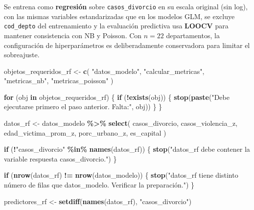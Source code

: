 \documentclass[
]{article}
\newenvironment{Shaded}{\begin{snugshade}}{\end{snugshade}}
\newcommand{\ControlFlowTok}[1]{\textcolor[rgb]{0.13,0.29,0.53}{\textbf{#1}}}
\newcommand{\FunctionTok}[1]{\textcolor[rgb]{0.13,0.29,0.53}{\textbf{#1}}}
\newcommand{\NormalTok}[1]{#1}
\newcommand{\OtherTok}[1]{\textcolor[rgb]{0.56,0.35,0.01}{#1}}
\newcommand{\SpecialCharTok}[1]{\textcolor[rgb]{0.81,0.36,0.00}{\textbf{#1}}}
\newcommand{\StringTok}[1]{\textcolor[rgb]{0.31,0.60,0.02}{#1}}
\begin{document}
Se entrena como \textbf{regresión} sobre \texttt{casos\_divorcio} en su
escala original (sin log), con las mismas variables estandarizadas que
en los modelos GLM, se excluye \texttt{cod\_depto} del entrenamiento y
la evaluación predictiva usa \textbf{LOOCV} para mantener consistencia
con NB y Poisson. Con \(n = 22\) departamentos, la configuración de
hiperparámetros es deliberadamente conservadora para limitar el
sobreajuste.

\begin{Shaded}
\begin{Highlighting}[]
\NormalTok{objetos\_requeridos\_rf }\OtherTok{\textless{}{-}} \FunctionTok{c}\NormalTok{(}
  \StringTok{"datos\_modelo"}\NormalTok{, }\StringTok{"calcular\_metricas"}\NormalTok{, }\StringTok{"metricas\_nb"}\NormalTok{, }\StringTok{"metricas\_poisson"}
\NormalTok{)}

\ControlFlowTok{for}\NormalTok{ (obj }\ControlFlowTok{in}\NormalTok{ objetos\_requeridos\_rf) \{}
  \ControlFlowTok{if}\NormalTok{ (}\SpecialCharTok{!}\FunctionTok{exists}\NormalTok{(obj)) \{}
    \FunctionTok{stop}\NormalTok{(}\FunctionTok{paste}\NormalTok{(}\StringTok{"Debe ejecutarse primero el paso anterior. Falta:"}\NormalTok{, obj))}
\NormalTok{  \}}
\NormalTok{\}}
\end{Highlighting}
\end{Shaded}

\begin{Shaded}
\begin{Highlighting}[]
\NormalTok{datos\_rf }\OtherTok{\textless{}{-}}\NormalTok{ datos\_modelo }\SpecialCharTok{\%\textgreater{}\%}
  \FunctionTok{select}\NormalTok{(}
\NormalTok{    casos\_divorcio,}
\NormalTok{    casos\_violencia\_z,}
\NormalTok{    edad\_victima\_prom\_z,}
\NormalTok{    porc\_urbano\_z,}
\NormalTok{    es\_capital}
\NormalTok{  )}

\ControlFlowTok{if}\NormalTok{ (}\SpecialCharTok{!}\StringTok{"casos\_divorcio"} \SpecialCharTok{\%in\%} \FunctionTok{names}\NormalTok{(datos\_rf)) \{}
  \FunctionTok{stop}\NormalTok{(}\StringTok{"datos\_rf debe contener la variable respuesta casos\_divorcio."}\NormalTok{)}
\NormalTok{\}}

\ControlFlowTok{if}\NormalTok{ (}\FunctionTok{nrow}\NormalTok{(datos\_rf) }\SpecialCharTok{!=} \FunctionTok{nrow}\NormalTok{(datos\_modelo)) \{}
  \FunctionTok{stop}\NormalTok{(}\StringTok{"datos\_rf tiene distinto número de filas que datos\_modelo. Verificar la preparación."}\NormalTok{)}
\NormalTok{\}}

\NormalTok{predictores\_rf }\OtherTok{\textless{}{-}} \FunctionTok{setdiff}\NormalTok{(}\FunctionTok{names}\NormalTok{(datos\_rf), }\StringTok{"casos\_divorcio"}\NormalTok{)}
\end{Highlighting}
\end{Shaded}
\end{document}
